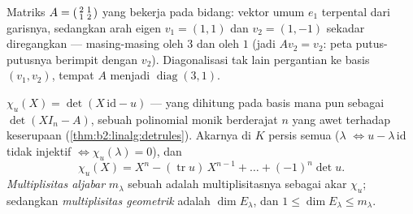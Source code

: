 \begin{omfigure}

{\small Matriks $A = \begin{psmallmatrix}2 & 1\\ 1 &
2\end{psmallmatrix}$ yang bekerja pada bidang: vektor umum
$e_1$ terpental dari garisnya, sedangkan arah eigen $v_1 =
(1,1)$ dan $v_2 = (1,-1)$ sekadar diregangkan --- masing-masing oleh $3$
dan oleh $1$ (jadi $Av_2 = v_2$: peta putus-putusnya berimpit dengan $v_2$).
Diagonalisasi tak lain pergantian ke basis $(v_1, v_2)$, tempat
$A$ menjadi $\operatorname{diag}(3, 1)$.}
\end{omfigure}

\begin{definition}\label{def:b2:reduction:charpoly}
$\chi_u(X) = \det(X\,\mathrm{id} - u)$ --- yang dihitung pada basis mana pun sebagai $\det(XI_n - A)$,
sebuah polinomial monik berderajat $n$ yang awet terhadap keserupaan
(\cref{thm:b2:linalg:detrules}). Akarnya di $K$ persis semua
 ($\lambda$  $\iff u - \lambda\,\mathrm{id}$
tidak injektif $\iff \chi_u(\lambda) = 0$), dan
\[
\chi_u(X) = X^n - (\operatorname{tr} u)\, X^{n-1} + \dots +
(-1)^n \det u .
\]
\emph{Multiplisitas aljabar}
$m_\lambda$ sebuah  adalah
multiplisitasnya sebagai akar $\chi_u$; sedangkan \emph{multiplisitas
geometrik} adalah $\dim E_\lambda$, dan
$1 \leq \dim E_\lambda \leq m_\lambda$.
\end{definition}

